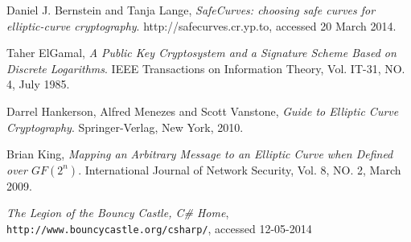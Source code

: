 \begin{thebibliography}{9}
	
		Daniel J. Bernstein and Tanja Lange,
		\emph{SafeCurves: choosing safe curves for elliptic-curve cryptography}.
		http://safecurves.cr.yp.to,
		accessed 20 March 2014.
		
	    Taher ElGamal,
		\emph{A Public Key Cryptosystem and a Signature Scheme Based on Discrete Logarithms}.
		IEEE Transactions on Information Theory, Vol. IT-31, NO. 4,
		July 1985.
	
		Darrel Hankerson, Alfred Menezes and Scott Vanstone,
		\emph{Guide to Elliptic Curve Cryptography}.
		Springer-Verlag, New York,
		2010.
		
		Brian King,
		\emph{Mapping an Arbitrary Message to an Elliptic Curve when Defined over \(GF(2^n)\)}.
		International Journal of Network Security, Vol. 8, NO. 2,
		March 2009.
		
		\emph{The Legion of the Bouncy Castle, C\# Home},
		\verb|http://www.bouncycastle.org/csharp/|, accessed 12-05-2014
	
\end{thebibliography}